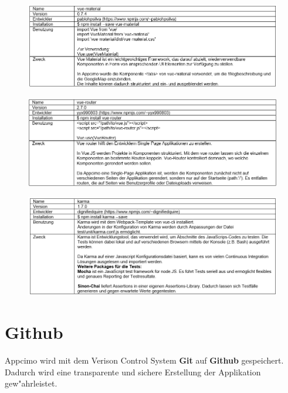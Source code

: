 \documentclass[a4paper, 11pt]{scrreprt}
\begin{document}
\begin{figure} [H]
\begin{center}
\includegraphics[scale=0.7]{package4.png}
\label{vue-material}
\end{center}
\end{figure}

\begin{figure} [H]
\begin{center}
\includegraphics[scale=0.7]{package5.png}
\label{vue-router}
\end{center}
\end{figure}

\begin{figure} [H]
\begin{center}
\includegraphics[scale=0.7]{package6.png}
\label{karma}
\end{center}
\end{figure}




\section{Github}
Appcimo wird mit dem Verison Control System \textbf{Git} auf \textbf{Github} gespeichert.
Dadurch wird eine transparente und sichere Erstellung der Applikation gew"ahrleistet. \\
\end{document}
